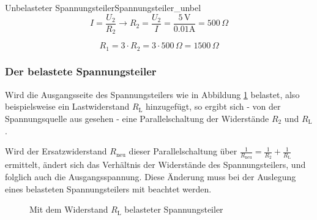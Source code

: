 \begin{frame}
{\begin{bsp}{Unbelasteter Spannungsteiler}{Spannungsteiler_unbel}
			\begin{equation*}
				I = \frac{U_2}{R_2} \rightarrow R_2 = \frac{U_2}{I} = \frac{5 \, \mathrm{V}}{0.01 \mathrm{A}} = 500 \, \Omega
			\end{equation*}

			\begin{equation*}
				R_1 = 3 \cdot R_2 = 3 \cdot 500 \, \Omega = 1500 \, \Omega
			\end{equation*}





		\end{bsp}

		\subsubsection{Der belastete Spannungsteiler}

		Wird die Ausgangsseite des Spannungsteilers wie in Abbildung \ref{fig:belspannungsteiler} belastet, also beispielsweise ein Lastwiderstand $R_\mathrm{L}$ hinzugefügt,
		so ergibt sich - von der Spannungsquelle aus gesehen - eine Parallelschaltung der Widerstände $R_2$ und $R_\mathrm{L}$.

		Wird der Ersatzwiderstand $R_\mathrm{neu}$ dieser Parallelschaltung über
		$\frac{1}{R_\mathrm{neu}} = \frac{1}{R_2} + \frac{1}{R_\mathrm{L}}$ ermittelt, ändert sich das Verhältnis der Widerstände des Spannungsteilers,
		und folglich auch die Ausgangsspannung. Diese Änderung muss bei der Auslegung eines belasteten Spannungsteilers mit beachtet werden.




		\begin{figure}[ht]
			\begin{center}


				\caption{Mit dem Widerstand $R_\mathrm{L}$ belasteter Spannungsteiler}
				\label{fig:belspannungsteiler}
			\end{center}
		\end{figure}





}
\end{frame}
